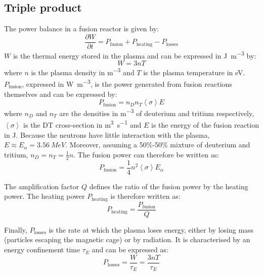 \subsection{Triple product}
The power balance in a fusion reactor is given by:
\begin{equation}
    \frac{\partial W}{\partial t} = P_\mathrm{fusion} + P_\mathrm{heating} - P_\mathrm{losses}
    \label{eq: plasma energy balance}
\end{equation}
$W$ is the thermal energy stored in the plasma and can be expressed in \si{J.m^{-3}} by:
\begin{equation}
    W = 3 n T
\end{equation}
where $n$ is the plasma density in \si{m^{-3}} and $T$ is the plasma temperature in \si{eV}.
$P_\mathrm{fusion}$, expressed in \si{W.m^{-3}}, is the power generated from fusion reactions themselves and can be expressed by:
\begin{equation}
    P_\mathrm{fusion} = n_D n_T \left\langle \sigma \right\rangle E
\end{equation}
where $n_D$ and $n_T$ are the densities in \si{m^{-3}} of deuterium and tritium respectively, $\left\langle \sigma \right\rangle$ is the DT cross-section in \si{m^3.s^{-1}} and $E$ is the energy of the fusion reaction in \si{J}.
Because the neutrons have little interaction with the plasma, $E \approx E_\alpha = \SI{3.56}{MeV}$.
Moreover, assuming a 50\%-50\% mixture of deuterium and tritium, $n_D = n_T = \frac{1}{2} n$.
The fusion power can therefore be written as:
\begin{equation}
    P_\mathrm{fusion} = \frac{1}{4} n^2 \left\langle \sigma \right\rangle E_\alpha
\end{equation}

The amplification factor $Q$ defines the ratio of the fusion power by the heating power.
The heating power $P_\mathrm{heating}$ is therefore written as:
\begin{equation}
    P_\mathrm{heating} = \frac{P_\mathrm{fusion}}{Q}
\end{equation}

Finally, $P_\mathrm{losses}$ is the rate at which the plasma loses energy, either by losing mass (particles escaping the magnetic cage) or by radiation.
It is characterised by an energy confinement time $\tau_E$ and can be expressed as:
\begin{equation}
    P_\mathrm{losses} = \frac{W}{\tau_E} = \frac{3 n T}{\tau_E}
\end{equation}

